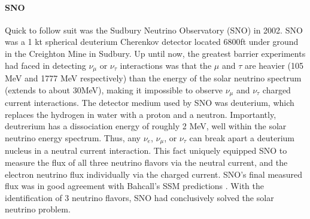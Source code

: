 \paragraph{SNO}
Quick to follow suit was the Sudbury Neutrino Observatory (SNO) in 2002.  SNO was a 1 kt spherical deuterium Cherenkov detector located 6800ft under ground in the Creighton Mine in Sudbury. Up until now, the greatest barrier experiments had faced in detecting $\nu_\mu$ or $\nu_\tau$ interactions was that the $\mu$ and $\tau$ are heavier (105 MeV and 1777 MeV respectively) than the energy of the solar neutrino spectrum (extends to about 30MeV), making it impossible to observe $\nu_\mu$ and $\nu_\tau$ charged current interactions.  The detector medium used by SNO was deuterium, which replaces the hydrogen in water with a proton and a neutron. Importantly, deutrerium has a dissociation energy of roughly 2 MeV, well within the solar neutrino energy spectrum.  Thus, any $\nu_e$, $\nu_\mu$, or $\nu_\tau$ can break apart a deuterium nucleus in a neutral current interaction. This fact uniquely equipped SNO to measure the flux of all three neutrino flavors via the neutral current, and the electron neutrino flux individually via the charged current. SNO's final measured flux was in good agreement with Bahcall's SSM predictions \cite{bib:sno}.  With the identification of 3 neutrino flavors, SNO had conclusively solved the solar neutrino problem.  




